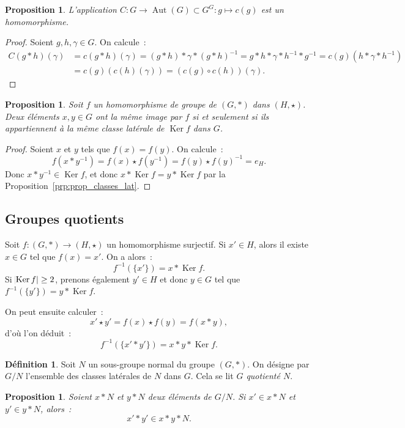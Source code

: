 \documentclass{article}
\newtheorem{prp}[thm]{Proposition}
\theoremstyle{definition}
\newtheorem{déf}[thm]{Définition}
\theoremstyle{remark}
\DeclareMathOperator{\Ker}{Ker}
\DeclareMathOperator{\Aut}{Aut}
\begin{document}
		\begin{prp} L'application $C : G \to \Aut(G) \subset G^G : g \mapsto c(g)$ est un homomorphisme.
		\end{prp}

		\begin{proof} Soient $g, h, \gamma \in G$. On calcule~:
		\begin{align*}
			C(g*h)(\gamma) &= c(g*h)(\gamma) = (g*h)*\gamma*(g*h)^{-1} = g*h*\gamma*h^{-1}*g^{-1} = c(g)(h*\gamma*h^{-1}) \\
			&= c(g)\left(c(h)(\gamma)\right) = \left(c(g) \circ c(h)\right)(\gamma).
		\end{align*}
		\end{proof}

		\begin{prp} Soit $f$ un homomorphisme de groupe de $(G, *)$ dans $(H, \star)$. Deux éléments $x, y \in G$ ont la même image par $f$ si et seulement si
		ils appartiennent à la même classe latérale de $\Ker f$ dans $G$.
		\end{prp}

		\begin{proof} Soient $x$ et $y$ tels que $f(x) = f(y)$. On calcule~:
		\[f(x*y^{-1}) = f(x) \star f(y^{-1}) = f(y) \star f(y)^{-1} = e_H.\]
		Donc $x*y^{-1} \in \Ker f$, et donc $x * \Ker f = y * \Ker f$ par la Proposition~\ref{prp:prop_classes_lat}.
		\end{proof}

	\subsection{Groupes quotients}
		Soit $f : (G, *) \to (H, \star)$ un homomorphisme surjectif. Si $x' \in H$, alors il existe $x \in G$ tel que $f(x) = x'$. On a alors~:
		\[f^{-1}(\{x'\}) = x*\Ker f.\]
		Si $\abs {\Ker f} \geq 2$, prenons également $y' \in H$ et donc $y \in G$ tel que $f^{-1}(\{y'\}) = y*\Ker f$.

		On peut ensuite calculer~:
		\[x' \star y' = f(x) \star f(y) = f(x*y),\]
		d'où l'on déduit~:
		\[f^{-1}(\{x'*y'\}) = x*y*\Ker f.\]

		\begin{déf} Soit $N$ un sous-groupe normal du groupe $(G, *)$. On désigne par $G/N$ l'ensemble des classes latérales de $N$ dans $G$. Cela se lit
		\textit{$G$ quotienté $N$}.
		\end{déf}

		\begin{prp} Soient $x*N$ et $y*N$ deux éléments de $G/N$. Si $x' \in x*N$ et $y' \in y*N$, alors~:
		\[x'*y' \in x*y*N.\]
		\end{prp}
\end{document}
